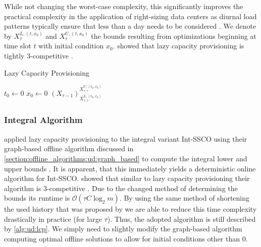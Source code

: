 While not changing the worst-case complexity, this significantly improves the practical complexity in the application of right-sizing data centers as diurnal load patterns typically ensure that less than a day needs to be considered \cite{Lin2011}. We denote by $X_{\tau}^{L,(t,x_0)}$ and $X_{\tau}^{U,(t,x_0)}$ the bounds resulting from optimizations beginning at time slot $t$ with initial condition $x_0$. \citeauthor*{Lin2011} showed that lazy capacity provisioning is tightly $3$-competitive \cite{Lin2011}.

\begin{algorithm}
    \caption{Lazy Capacity Provisioning \cite{Lin2011}}\label{alg:ud:lcp}
    $t_0 \gets 0$\;
    $x_0 \gets 0$\;
    \Return $(X_{\tau-1})_{X_{\tau,\tau}^{L,(t_0,x_0)}}^{X_{\tau,\tau}^{U,(t_0,x_0)}}$\;
\end{algorithm}

\subsubsection{Integral Algorithm}

\citeauthor*{Albers2018} applied lazy capacity provisioning to the integral variant Int-SSCO using their graph-based offline algorithm discussed in \autoref{section:offline_algorithms:ud:graph_based} to compute the integral lower and upper bounds \cite{Albers2018}. It is apparent, that this immediately yields a deterministic online algorithm for Int-SSCO. \citeauthor*{Albers2018} showed that similar to lazy capacity provisioning their algorithm is $3$-competitive \cite{Albers2018}. Due to the changed method of determining the bounds its runtime is $\mathcal{O}(\tau C \log_2 m)$. By using the same method of shortening the used history that was proposed by \citeauthor*{Lin2011} we are able to reduce this time complexity drastically in practice (for large $\tau$). Thus, the adopted algorithm is still described by \autoref{alg:ud:lcp}. We simply need to slightly modify the graph-based algorithm computing optimal offline solutions to allow for initial conditions other than $0$.

